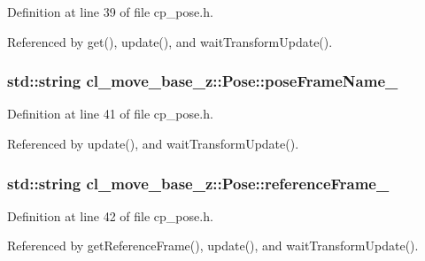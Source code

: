 Definition at line 39 of file cp\+\_\+pose.\+h.



Referenced by get(), update(), and wait\+Transform\+Update().

\subsubsection[{\texorpdfstring{pose\+Frame\+Name\+\_\+}{poseFrameName_}}]{\setlength{\rightskip}{0pt plus 5cm}std\+::string cl\+\_\+move\+\_\+base\+\_\+z\+::\+Pose\+::pose\+Frame\+Name\+\_\+\hspace{0.3cm}{\ttfamily [private]}}\hypertarget{classcl__move__base__z_1_1Pose_a4f45be8e2fd73e618d815582a4ca8efe}{}\label{classcl__move__base__z_1_1Pose_a4f45be8e2fd73e618d815582a4ca8efe}


Definition at line 41 of file cp\+\_\+pose.\+h.



Referenced by update(), and wait\+Transform\+Update().

\subsubsection[{\texorpdfstring{reference\+Frame\+\_\+}{referenceFrame_}}]{\setlength{\rightskip}{0pt plus 5cm}std\+::string cl\+\_\+move\+\_\+base\+\_\+z\+::\+Pose\+::reference\+Frame\+\_\+\hspace{0.3cm}{\ttfamily [private]}}\hypertarget{classcl__move__base__z_1_1Pose_a6a7a593232b6edaf99103d48ad8da9d3}{}\label{classcl__move__base__z_1_1Pose_a6a7a593232b6edaf99103d48ad8da9d3}


Definition at line 42 of file cp\+\_\+pose.\+h.



Referenced by get\+Reference\+Frame(), update(), and wait\+Transform\+Update().

